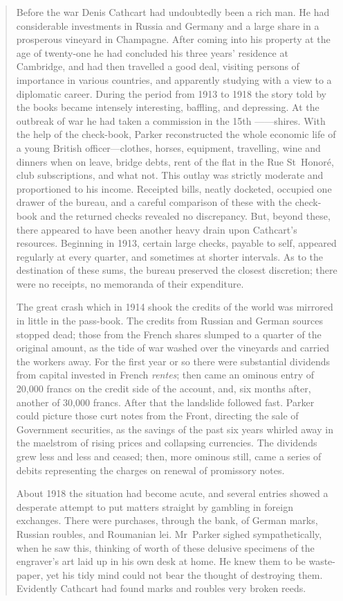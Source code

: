 \begin{quotation}
Before the war Denis Cathcart had undoubtedly been a rich man. He had considerable investments in Russia and Germany and a large share in a prosperous vineyard in Champagne. After coming into his property at the age of twenty-one he had concluded his three years' residence at Cambridge, and had then travelled a good deal, visiting persons of importance in various countries, and apparently studying with a view to a diplomatic career. During the period from 1913 to 1918 the story told by the books became intensely interesting, baffling, and depressing. At the outbreak of war he had taken a commission in the 15th ——shires.  With the help of the check-book, Parker reconstructed the whole economic life of a young British officer—clothes, horses, equipment, travelling, wine and dinners when on leave, bridge debts, rent of the flat in the Rue St~Honoré, club subscriptions, and what not. This outlay was strictly moderate and proportioned to his income. Receipted bills, neatly docketed, occupied one drawer of the bureau, and a careful comparison of these with the check-book and the returned checks revealed no discrepancy. But, beyond these, there appeared to have been another heavy drain upon Cathcart's resources. Beginning in 1913, certain large checks, payable to self, appeared regularly at every quarter, and sometimes at shorter intervals. As to the destination of these sums, the bureau preserved the closest discretion; there were no receipts, no memoranda of their expenditure.

The great crash which in 1914 shook the credits of the world was mirrored in little in the pass-book. The credits from Russian and German sources stopped dead; those from the French shares slumped to a quarter of the original amount, as the tide of war washed over the vineyards and carried the workers away. For the first year or so there were substantial dividends from capital invested in French \textit{rentes}; then came an ominous entry of 20,000 francs on the credit side of the account, and, six months after, another of 30,000 francs. After that the landslide followed fast. Parker could picture those curt notes from the Front, directing the sale of Government securities, as the savings of the past six years whirled away in the maelstrom of rising prices and collapsing currencies. The dividends grew less and less and ceased; then, more ominous still, came a series of debits representing the charges on renewal of promissory notes.

About 1918 the situation had become acute, and several entries showed a desperate attempt to put matters straight by gambling in foreign exchanges. There were purchases, through the bank, of German marks, Russian roubles, and Roumanian lei. Mr~Parker sighed sympathetically, when he saw this, thinking of  worth of these delusive specimens of the engraver's art laid up in his own desk at home. He knew them to be waste-paper, yet his tidy mind could not bear the thought of destroying them. Evidently Cathcart had found marks and roubles very broken reeds.


\end{quotation}
